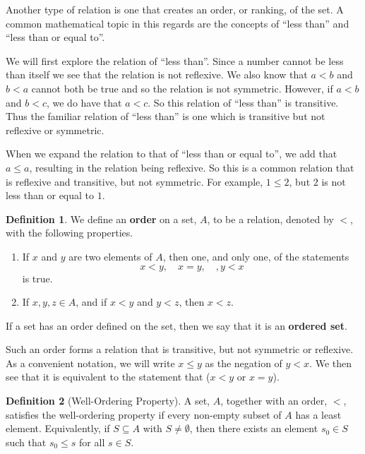 \documentclass[
]{book}
\providecommand{\tightlist}{%
  \setlength{\itemsep}{0pt}\setlength{\parskip}{0pt}}
\theoremstyle{definition}
\newtheorem{definition}{Definition}[chapter]
\theoremstyle{definition}
\theoremstyle{definition}
\theoremstyle{definition}
\theoremstyle{remark}
\begin{document}
Another type of relation is one that creates an order, or ranking, of the set. A common mathematical topic in this regards are the concepts of ``less than'' and ``less than or equal to''.

We will first explore the relation of ``less than''. Since a number cannot be less than itself we see that the relation is not reflexive. We also know that \(a<b\) and \(b<a\) cannot both be true and so the relation is not symmetric. However, if \(a<b\) and \(b<c\), we do have that \(a<c\). So this relation of ``less than'' is transitive. Thus the familiar relation of ``less than'' is one which is transitive but not reflexive or symmetric.

When we expand the relation to that of ``less than or equal to'', we add that \(a\leq a\), resulting in the relation being reflexive. So this is a common relation that is reflexive and transitive, but not symmetric. For example, \(1\leq 2\), but \(2\) is not less than or equal to \(1\).

\begin{definition}
\protect\hypertarget{def:order}{}\label{def:order}We define an \textbf{order} on a set, \(A\), to be a relation, denoted by \(<\), with the following properties.

\begin{enumerate}
\def\labelenumi{\arabic{enumi}.}
\tightlist
\item
  If \(x\) and \(y\) are two elements of \(A\), then one, and only one, of the statements \[x<y, \quad x=y, \quad, y<x\] is true.
\item
  If \(x,y,z \in A\), and if \(x<y\) and \(y<z\), then \(x<z\).
\end{enumerate}

If a set has an order defined on the set, then we say that it is an \textbf{ordered set}.
\end{definition}

Such an order forms a relation that is transitive, but not symmetric or reflexive. As a convenient notation, we will write \(x\leq y\) as the negation of \(y<x\). We then see that it is equivalent to the statement that (\(x<y\) or \(x=y\)).

\begin{definition}[Well-Ordering Property]
\protect\hypertarget{def:well-ordering}{}\label{def:well-ordering}A set, \(A\), together with an order, \(<\), satisfies the well-ordering property if every non-empty subset of \(A\) has a least element. Equivalently, if \(S\subseteq A\) with \(S\neq \emptyset\), then there exists an element \(s_0\in S\) such that \(s_0 \leq s\) for all \(s\in S\).
\end{definition}
\end{document}
